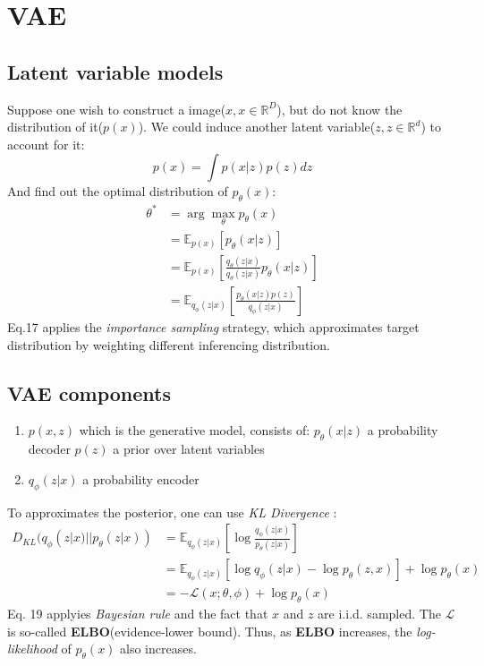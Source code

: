 \documentclass{article}
\newcommand{\argmax}{\arg\!\max}
\begin{document}
\section{VAE}
\subsection{Latent variable models}
Suppose one wish to construct a image($x, x\in \mathbb{R}^{D}$), but do not know the distribution of it($p(x)$). We could induce another latent variable($z, z\in \mathbb{R}^d$) to account for it:
\begin{equation}
p(x) = \int p(x|z)p(z)dz     
\end{equation}
And find out the optimal distribution of $p_{\theta}(x)$:
    \begin{align}
    \theta^{*} &= \argmax_{\theta} p_{\theta}(x)\\
    & =\mathbb{E}_{p(x)} [p_{\theta}(x|z)]\\ 
    & =\mathbb{E}_{p(x)} [\frac{q_{\theta}(z|x)}{q_{\theta}(z|x)}p_{\theta}(x|z)]\\
    & =\mathbb{E}_{q_{\phi}(z|x)}[\frac{p_{\theta}(x|z)p(z)}{q_{\phi}(z|x)}]
    \end{align}
Eq.17 applies the \textit{importance sampling} strategy, which approximates target distribution by weighting different inferencing distribution. 
\subsection{VAE components}
\begin{enumerate}
    \item $p(x,z)$ which is the generative model, consists of: 
    \subitem * $p_{\theta}(x|z)$ a probability decoder
    \subitem * $p(z)$ a prior over latent variables
    \item $q_{\phi}(z|x)$ a probability encoder
\end{enumerate}
To approximates the posterior, one can use \textit{KL Divergence} :
\begin{align}
    D_{KL}(q_{\phi}(z|x)||p_{\theta}(z|x)) &= \mathbb{E}_{q_{\phi}(z|x)}[\log{\frac{q_{\phi}(z|x)}{p_{\theta}(z|x)}}]\\
    &=\mathbb{E}_{q_{\phi}(z|x)}[\log{q_{\phi}(z|x)} - \log{p_{\theta}(z,x)}]+\log{p_{\theta}(x)}\\
    &= -\mathcal{L}(x;\theta,\phi) + \log{p_{\theta}(x)}
\end{align}
Eq. 19 applyies \textit{Bayesian rule} and the fact that $x$ and $z$ are i.i.d. sampled. The $\mathcal{L}$ is so-called \textbf{ELBO}(evidence-lower bound). Thus, as \textbf{ELBO} increases, the \textit{log-likelihood} of $p_{\theta}(x)$ also increases.
\end{document}
